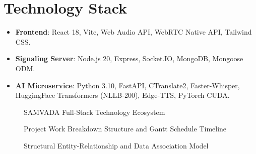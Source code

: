 \documentclass[12pt,a4paper]{report}
\begin{document}
\section{Technology Stack}
\begin{itemize}
    \item \textbf{Frontend}: React 18, Vite, Web Audio API, WebRTC Native API, Tailwind CSS.
    \item \textbf{Signaling Server}: Node.js 20, Express, Socket.IO, MongoDB, Mongoose ODM.
    \item \textbf{AI Microservice}: Python 3.10, FastAPI, CTranslate2, Faster-Whisper, HuggingFace Transformers (NLLB-200), Edge-TTS, PyTorch CUDA.
\end{itemize}

\begin{figure}[H]
  \centering
  \caption{SAMVADA Full-Stack Technology Ecosystem}
  \label{fig:fig3_2}
\end{figure}

\begin{figure}[H]
  \centering
  \caption{Project Work Breakdown Structure and Gantt Schedule Timeline}
  \label{fig:fig3_3}
\end{figure}

\begin{figure}[H]
  \centering
  \caption{Structural Entity-Relationship and Data Association Model}
  \label{fig:fig3_4}
\end{figure}
\end{document}
